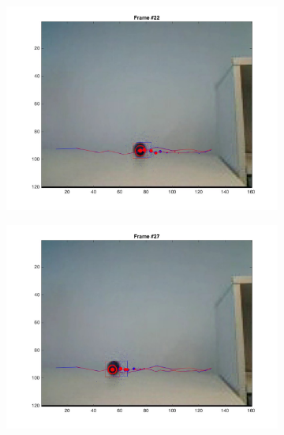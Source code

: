 \documentclass{ethz_report}
\begin{document}
\begin{figure}[h]
\begin{subfigure}[b]{.25\textwidth}
        \includegraphics[width=1\linewidth]{images/video3_noise_low_21}
    \end{subfigure}%
    \begin{subfigure}[b]{.25\textwidth}
        \centering
        \includegraphics[width=1\linewidth]{images/video3_noise_low_26}
    \end{subfigure}%
    \begin{subfigure}[b]{.25\textwidth}
        \centering

\end{subfigure}
\end{figure}
\end{document}
